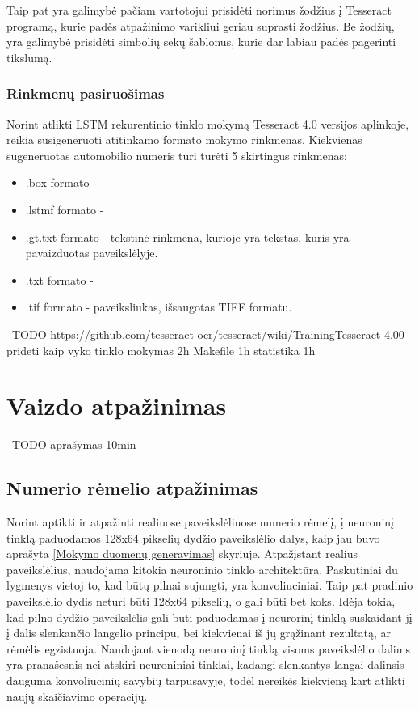 \documentclass{VUMIFInfBakalaurinis}
\begin{document}
Taip pat yra galimybė pačiam vartotojui prisidėti norimus žodžius į Tesseract programą, kurie padės atpažinimo varikliui geriau suprasti žodžius.
Be žodžių, yra galimybė prisidėti simbolių sekų šablonus, kurie dar labiau padės pagerinti tikslumą.

\subsubsection{Rinkmenų pasiruošimas}
Norint atlikti LSTM rekurentinio tinklo mokymą Tesseract 4.0 versijos aplinkoje, reikia susigeneruoti atitinkamo formato mokymo rinkmenas.
Kiekvienas sugeneruotas automobilio numeris turi turėti 5 skirtingus rinkmenas:
\begin{itemize} --TODO
  \item .box formato - 
  \item .lstmf formato - 
  \item .gt.txt formato - tekstinė rinkmena, kurioje yra tekstas, kuris yra pavaizduotas paveikslėlyje.
  \item .txt formato - 
  \item .tif formato - paveiksliukas, išsaugotas TIFF formatu.
\end{itemize}

--TODO
https://github.com/tesseract-ocr/tesseract/wiki/TrainingTesseract-4.00
prideti kaip vyko tinklo mokymas 2h
Makefile 1h
statistika 1h





\pagebreak
\section{Vaizdo atpažinimas}
--TODO
aprašymas 10min

\subsection{Numerio rėmelio atpažinimas}
Norint aptikti ir atpažinti realiuose paveikslėliuose numerio rėmelį, į neuroninį tinklą paduodamos 128x64 pikselių dydžio
paveikslėlio dalys, kaip jau buvo aprašyta \ref{Mokymo duomenų generavimas} skyriuje.
Atpažįstant realius paveikslėlius, naudojama kitokia neuroninio tinklo architektūra. Paskutiniai du lygmenys vietoj to, 
kad būtų pilnai sujungti, yra konvoliuciniai. Taip pat pradinio paveikslėlio dydis neturi būti 128x64 pikselių, o gali būti
bet koks. Idėja tokia, kad pilno dydžio paveikslėlis gali būti paduodamas į neurorinį tinklą suskaidant jį į dalis slenkančio
langelio principu, bei kiekvienai iš jų grąžinant rezultatą, ar rėmėlis egzistuoja. Naudojant vienodą neuroninį tinklą visoms 
paveikslėlio dalims yra pranašesnis nei atskiri neuroniniai tinklai, kadangi slenkantys langai dalinsis dauguma konvoliucinių 
savybių tarpusavyje, todėl nereikės kiekvieną kart atlikti naujų skaičiavimo operacijų.
\end{document}
